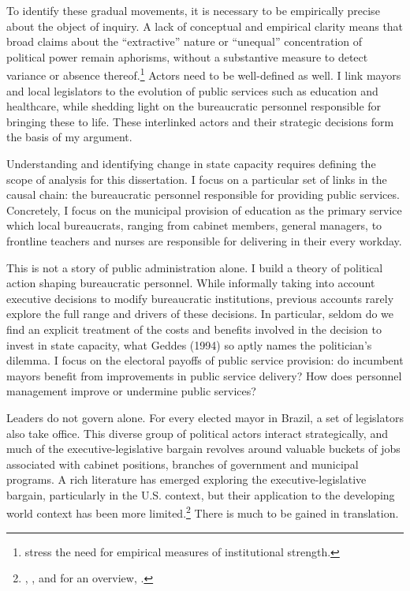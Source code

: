\documentclass[12pt,]{book}
\let\rmarkdownfootnote\footnote%
\def\footnote{\protect\rmarkdownfootnote}
\begin{document}
To identify these gradual movements, it is necessary to be empirically precise about the object of inquiry. A lack of conceptual and empirical clarity means that broad claims about the ``extractive'' nature or ``unequal'' concentration of political power remain aphorisms, without a substantive measure to detect variance or absence thereof.\footnote{\citet{levitsky_variation_2009} stress the need for empirical measures of institutional strength.} Actors need to be well-defined as well. I link mayors and local legislators to the evolution of public services such as education and healthcare, while shedding light on the bureaucratic personnel responsible for bringing these to life. These interlinked actors and their strategic decisions form the basis of my argument.

Understanding and identifying change in state capacity requires defining the scope of analysis for this dissertation. I focus on a particular set of links in the causal chain: the bureaucratic personnel responsible for providing public services. Concretely, I focus on the municipal provision of education as the primary service which local bureaucrats, ranging from cabinet members, general managers, to frontline teachers and nurses are responsible for delivering in their every workday.

This is not a story of public administration alone. I build a theory of political action shaping bureaucratic personnel. While informally taking into account executive decisions to modify bureaucratic institutions, previous accounts rarely explore the full range and drivers of these decisions. In particular, seldom do we find an explicit treatment of the costs and benefits involved in the decision to invest in state capacity, what Geddes (1994) so aptly names the politician's dilemma. I focus on the electoral payoffs of public service provision: do incumbent mayors benefit from improvements in public service delivery? How does personnel management improve or undermine public services?

Leaders do not govern alone. For every elected mayor in Brazil, a set of legislators also take office. This diverse group of political actors interact strategically, and much of the executive-legislative bargain revolves around valuable buckets of jobs associated with cabinet positions, branches of government and municipal programs. A rich literature has emerged exploring the executive-legislative bargain, particularly in the U.S. context, but their application to the developing world context has been more limited.\footnote{\citet{moe_politics_1989}, \citet{mccarty_appointments_2004}, and for an overview, \citet{cameron_models_2004}.} There is much to be gained in translation.
\end{document}
